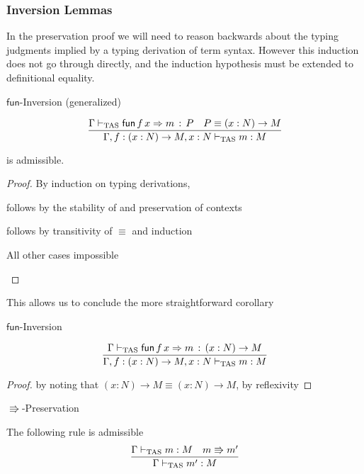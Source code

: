 \subsubsection{Inversion Lemmas}
In the preservation proof we will need to reason backwards about the typing judgments implied by a typing derivation of term syntax.
However this induction does not go through directly, and the induction hypothesis must be extended to definitional equality.

\begin{lem}
$\mathsf{fun}$-Inversion (generalized)

\[
\frac{\Gamma\vdash_{\mathrm{TAS}}\mathsf{fun}\,f\,x\Rightarrow m\,:\,P\quad P\equiv\left(x:N\right)\rightarrow M}{\Gamma,f:\left(x:N\right)\rightarrow M,x:N\vdash_{\mathrm{TAS}} m:M}
\]

is admissible. 
\end{lem}

\begin{proof}
By induction on typing derivations,

\begin{casenv}
  \item {} follows by the stability of  and preservation of contexts
  \item {} follows by transitivity of $\equiv$ and induction
  \item All other cases impossible
\end{casenv}

\end{proof}
This allows us to conclude the more straightforward corollary 
\begin{cor}
$\mathsf{fun}$-Inversion

\[
\frac{\Gamma\vdash_{\mathrm{TAS}}\mathsf{fun}\,f\,x\Rightarrow m\,:\,\left(x:N\right)\rightarrow M}{\Gamma,f:\left(x:N\right)\rightarrow M,x:N\vdash_{\mathrm{TAS}} m:M}
\]
\end{cor}

\begin{proof}
by noting that $\left(x:N\right)\rightarrow M\equiv\left(x:N\right)\rightarrow M$, by reflexivity 
\end{proof}
\begin{thm}
$\Rrightarrow$-Preservation 

The following rule is admissible
\[
\frac{\Gamma\vdash_{\mathrm{TAS}} m:M\quad m\Rrightarrow m'}{\Gamma\vdash_{\mathrm{TAS}} m':M}
\]
\end{thm}

